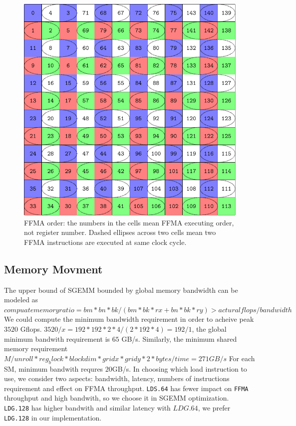 \documentclass{sig-alternate-05-2015}
\begin{document}
\begin{figure}[htbp]
\begin{center}
\includegraphics[scale=0.45]{order}
\caption{FFMA order: the numbers in the cells mean FFMA executing order, not register number.
Dashed ellipses across two cells mean two FFMA instructions are executed at same clock cycle. }
\label{fig:order}
\end{center}
\end{figure}

\subsection{Memory Movment}
The upper bound of SGEMM bounded by global memory bandwidth can be modeled as
$compuate memory ratio =  bm*bn*bk/(bm*bk*rx + bn*bk*ry)> actural flops/ bandwidth $
We could compute the minimum bandwidth requirement in order to acheive peak $3520$ Gflops.
$3520/x = 192*192*2*4/(2*192*4)=192/1$, the global minimum bandwith requirement is $65$ GB/s.
Similarly, the minimum shared memory requirement
$M/unroll*reg_block*blockdim*gridx*gridy*2*bytes/time = 271GB/s$
For each SM, minimum bandwith requres $20$GB/s.
In choosing which load instruction to use, we consider two aspects: bandwidth,
latency, numbers of instructions requirement and effect on FFMA throughput.
{\tt LDS.64} has fewer impact on {\tt FFMA} throughput and high bandwith, so we choose it in SGEMM optimization.
{\tt LDG.128} has higher bandwith and similar latency with $LDG.64$, we prefer {\tt LDG.128} in our implementation.
\end{document}
